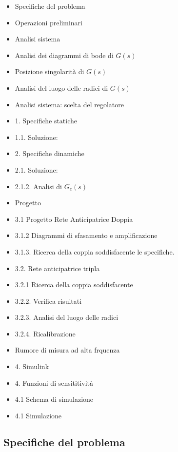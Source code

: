 \documentclass{article}
\begin{document}
\begin{itemize}
\setlength{\itemsep}{-1ex}
   \item Specifiche del problema
   \item Operazioni preliminari
   \item Analisi sistema
   \item Analisi dei diagrammi di bode di $ G(s) $
   \item Posizione singolarità di $ G(s) $
   \item Analisi del luogo delle radici di $ G(s) $
   \item Analisi sistema: scelta del regolatore
   \item 1. Specifiche statiche
   \item 1.1. Soluzione:
   \item 2. Specifiche dinamiche
   \item 2.1. Soluzione:
   \item 2.1.2. Analisi di $ G_e(s) $
   \item Progetto
   \item 3.1 Progetto Rete Anticipatrice Doppia
   \item 3.1.2 Diagrammi di sfasamento e amplificazione
   \item 3.1.3. Ricerca della coppia soddisfacente le specifiche.
   \item 3.2. Rete anticipatrice tripla
   \item 3.2.1 Ricerca della coppia soddisfacente
   \item 3.2.2. Verifica risultati
   \item 3.2.3. Analisi del luogo delle radici
   \item 3.2.4. Ricalibrazione
   \item Rumore di misura ad alta frquenza
   \item 4. Simulink
   \item 4. Funzioni di sensititività
   \item 4.1 Schema di simulazione
   \item 4.1 Simulazione
\end{itemize}

\clearpage

\subsection*{Specifiche del problema}
\end{document}
